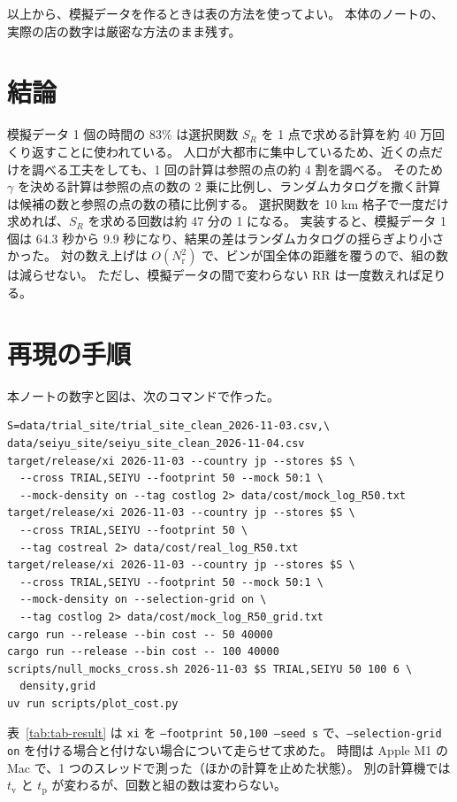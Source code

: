 \documentclass[a4paper,11pt]{ltjsarticle}
\newcommand{\code}[1]{\texttt{#1}}
\begin{document}
以上から、模擬データを作るときは表の方法を使ってよい。
本体のノートの、実際の店の数字は厳密な方法のまま残す。

\section{結論}
\label{sec:conclusion}

模擬データ 1 個の時間の $83\%$ は選択関数 $S_R$ を 1 点で求める計算を約 40 万回くり返すことに使われている。
人口が大都市に集中しているため、近くの点だけを調べる工夫をしても、1 回の計算は参照の点の約 4 割を調べる。
そのため $\gamma$ を決める計算は参照の点の数の 2 乗に比例し、ランダムカタログを撒く計算は候補の数と参照の点の数の積に比例する。
選択関数を 10 km 格子で一度だけ求めれば、$S_R$ を求める回数は約 47 分の 1 になる。
実装すると、模擬データ 1 個は 64.3 秒から 9.9 秒になり、結果の差はランダムカタログの揺らぎより小さかった。
対の数え上げは $O(N_{\mathrm{r}}^2)$ で、ビンが国全体の距離を覆うので、組の数は減らせない。
ただし、模擬データの間で変わらない RR は一度数えれば足りる。

\appendix

\section{再現の手順}
\label{app:reproduce}

本ノートの数字と図は、次のコマンドで作った。
\begin{verbatim}
S=data/trial_site/trial_site_clean_2026-11-03.csv,\
data/seiyu_site/seiyu_site_clean_2026-11-04.csv
target/release/xi 2026-11-03 --country jp --stores $S \
  --cross TRIAL,SEIYU --footprint 50 --mock 50:1 \
  --mock-density on --tag costlog 2> data/cost/mock_log_R50.txt
target/release/xi 2026-11-03 --country jp --stores $S \
  --cross TRIAL,SEIYU --footprint 50 \
  --tag costreal 2> data/cost/real_log_R50.txt
target/release/xi 2026-11-03 --country jp --stores $S \
  --cross TRIAL,SEIYU --footprint 50 --mock 50:1 \
  --mock-density on --selection-grid on \
  --tag costlog 2> data/cost/mock_log_R50_grid.txt
cargo run --release --bin cost -- 50 40000
cargo run --release --bin cost -- 100 40000
scripts/null_mocks_cross.sh 2026-11-03 $S TRIAL,SEIYU 50 100 6 \
  density,grid
uv run scripts/plot_cost.py
\end{verbatim}
表~\ref{tab:tab-result} は \code{xi} を \code{--footprint 50,100 --seed s} で、\code{--selection-grid on} を付ける場合と付けない場合について走らせて求めた。
時間は Apple M1 の Mac で、1 つのスレッドで測った（ほかの計算を止めた状態）。
別の計算機では $t_{\mathrm{v}}$ と $t_{\mathrm{p}}$ が変わるが、回数と組の数は変わらない。
\end{document}
